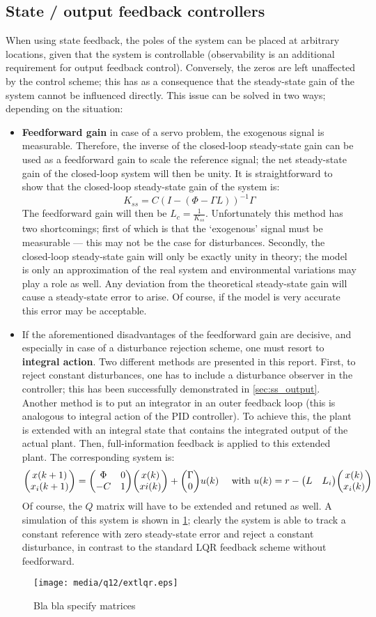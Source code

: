 \subsection*{State / output feedback controllers}
When using state feedback, the poles of the system can be placed at arbitrary locations, given that the system is controllable (observability is an additional requirement for output feedback control). Conversely, the zeros are left unaffected by the control scheme; this has as a consequence that the steady-state gain of the system cannot be influenced directly. This issue can be solved in two ways; depending on the situation:
\begin{itemize}
    \item \textbf{Feedforward gain} in case of a servo problem, the exogenous signal is measurable. Therefore, the inverse of the closed-loop steady-state gain can be used as a feedforward gain to scale the reference signal; the net steady-state gain of the closed-loop system will then be unity. It is straightforward to show that the closed-loop steady-state gain of the system is:
    $$ K_{ss} = C(I - (\Phi - \Gamma L))^{-1}\Gamma$$
    The feedforward gain will then be $L_c = \frac{1}{K_{ss}}$. Unfortunately this method has two shortcomings; first of which is that the `exogenous' signal must be measurable --- this may not be the case for disturbances. Secondly, the closed-loop steady-state gain will only be exactly unity in theory; the model is only an approximation of the real system and environmental variations may play a role as well. Any deviation from the theoretical steady-state gain will cause a steady-state error to arise. Of course, if the model is very accurate this error may be acceptable. \cite{keviczky}
    \item If the aforementioned disadvantages of the feedforward gain are decisive, and especially in case of a disturbance rejection scheme, one must resort to \textbf{integral action}. Two different methods are presented in this report. First, to reject constant disturbances, one has to include a disturbance observer in the controller; this has been successfully demonstrated in \cref{sec:ss_output}. Another method is to put an integrator in an outer feedback loop (this is analogous to integral action of the PID controller). To achieve this, the plant is extended with an integral state that contains the integrated output of the actual plant. Then, full-information feedback is applied to this extended plant. The corresponding system is:
        $$ \mqty(x(k+1)\\x_i(k+1)) = \mqty(\Phi & 0 \\ -C & 1)\mqty(x(k)\\xi(k)) + \mqty(\Gamma\\0)u(k)\quad\text{ with }u(k) = r - \mqty(L & L_i)\mqty(x(k)\\x_i(k))$$ 
    Of course, the $Q$ matrix will have to be extended and retuned as well. A simulation of this system is shown in \cref{fig:q12_extlqr}; clearly the system is able to track a constant reference with zero steady-state error and reject a constant disturbance, in contrast to the standard LQR feedback scheme without feedforward.
\end{itemize}
\begin{figure}
    \centering
    \texttt{[image: media/q12/extlqr.eps]}
    \caption{Bla bla specify matrices}
    \label{fig:q12_extlqr}
\end{figure}